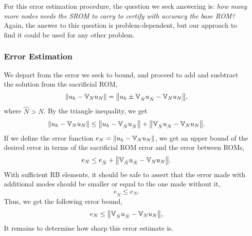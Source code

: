 \documentclass[../../thesis.tex]{subfiles}
\newcommand{\rbV}{\ensuremath{\mathbb{V}}}
\begin{document}
For this error estimation procedure, the question we seek answering is:
\textit{how many more nodes needs the SROM to carry to certify with accuracy the base ROM?}
Again, the answer to this question is problem-dependent,
but our approach to find it could be used for any other problem.

\subsubsection{Error Estimation}
We depart from the error we seek to bound,
and proceed to add and susbtract the solution from the sacrificial ROM,
\begin{equation}
    \norm{u_h - \rbV_{N} u_N} = \norm{u_h \pm \rbV_{\hat{N}} u_{\hat{N}} - \rbV_{N} u_{N}},
\end{equation}
where $\hat{N} > N$. 
By the triangle inequality, we get
\begin{equation}
    \norm{u_h - \rbV_{N} u_N} \leq \norm{u_h - \rbV_{\hat{N}} u_{\hat{N}}} + \norm{\rbV_{\hat{N}} u_{\hat{N}} - \rbV_{N} u_{N}}.
\end{equation}
If we define the error function $e_N = \norm{u_h - \rbV_{N} u_N}$, 
we get an upper bound of the desired error in terms of the sacrificial ROM error and the error between ROMs,
\begin{equation}
    e_N \leq e_{\hat{N}} + \norm{\rbV_{\hat{N}} u_{\hat{N}} - \rbV_{N} u_{N}}.
\end{equation}
With sufficient RB elements, it should be safe to assert that the error made 
with additional modes should be smaller or equal to the one made without it,
\begin{equation}
    e_{\hat{N}} \leq e_{N}.
\end{equation}
Thus, we get the following error bound,
\begin{equation}
    e_N \leq \norm{\rbV_{\hat{N}} u_{\hat{N}} - \rbV_{N} u_{N}},
\end{equation}
It remains to determine how sharp this error estimate is.
\end{document}
